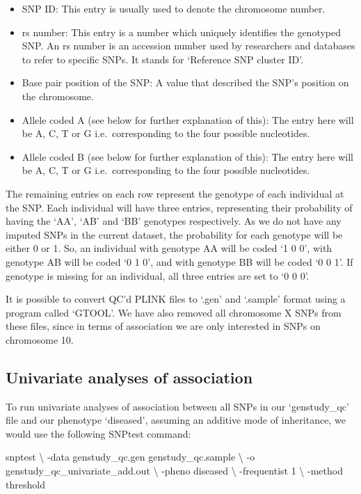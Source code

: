 \documentclass[]{book}
\newenvironment{Shaded}{\begin{snugshade}}{\end{snugshade}}
\newcommand{\ExtensionTok}[1]{#1}
\newcommand{\NormalTok}[1]{#1}
\providecommand{\tightlist}{%
  \setlength{\itemsep}{0pt}\setlength{\parskip}{0pt}}
\begin{document}
\begin{itemize}
\tightlist
\item
  SNP ID: This entry is usually used to denote the chromosome number.
\item
  rs number: This entry is a number which uniquely identifies the
  genotyped SNP. An rs number is an accession number used by researchers
  and databases to refer to specific SNPs. It stands for `Reference SNP
  cluster ID'.
\item
  Base pair position of the SNP: A value that described the SNP's
  position on the chromosome.
\item
  Allele coded A (see below for further explanation of this): The entry
  here will be A, C, T or G i.e.~corresponding to the four possible
  nucleotides.
\item
  Allele coded B (see below for further explanation of this): The entry
  here will be A, C, T or G i.e.~corresponding to the four possible
  nucleotides.
\end{itemize}

The remaining entries on each row represent the genotype of each
individual at the SNP. Each individual will have three entries,
representing their probability of having the `AA', `AB' and `BB'
genotypes respectively. As we do not have any imputed SNPs in the
current dataset, the probability for each genotype will be either 0 or
1. So, an individual with genotype AA will be coded `1 0 0', with
genotype AB will be coded `0 1 0', and with genotype BB will be coded `0
0 1'. If genotype is missing for an individual, all three entries are
set to `0 0 0'.

It is possible to convert QC'd PLINK files to `.gen' and `.sample'
format using a program called `GTOOL'. We have also removed all
chromosome X SNPs from these files, since in terms of association we are
only interested in SNPs on chromosome 10.

\subsection{Univariate analyses of
association}\label{univariate-analyses-of-association}

To run univariate analyses of association between all SNPs in our
`genstudy\_qc' file and our phenotype `diseased', assuming an additive
mode of inheritance, we would use the following SNPtest command:

\begin{Shaded}
\begin{Highlighting}[]
\ExtensionTok{snptest}\NormalTok{ \textbackslash{}}
\NormalTok{-data genstudy_qc.gen genstudy_qc.sample \textbackslash{}}
\NormalTok{-o genstudy_qc_univariate_add.out \textbackslash{}}
\NormalTok{-pheno diseased \textbackslash{}}
\NormalTok{-frequentist 1 \textbackslash{}}
\NormalTok{-method threshold}
\end{Highlighting}
\end{Shaded}
\end{document}
